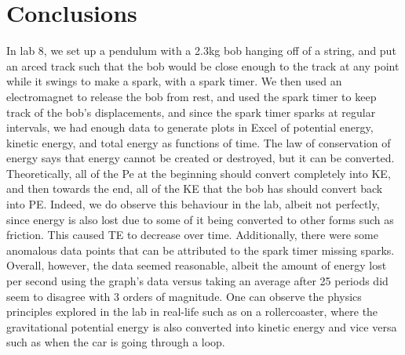 \documentclass[letterpaper]{article}
\begin{document}
\section{Conclusions}
  In lab 8, we set up a pendulum with a 2.3kg bob hanging off of a string, and put an arced track such that the bob would be close enough to the track at any point while it swings to make a spark, with a spark timer. We then used an electromagnet to release the bob from rest, and used the spark timer to keep track of the bob’s displacements, and since the spark timer sparks at regular intervals, we had enough data to generate plots in Excel of potential energy, kinetic energy, and total energy as functions of time. The law of conservation of energy says that energy cannot be created or destroyed, but it can be converted. Theoretically, all of the Pe at the beginning should convert completely into KE, and then towards the end, all of the KE that the bob has should convert back into PE. Indeed, we do observe this behaviour in the lab, albeit not perfectly, since energy is also lost due to some of it being converted to other forms such as friction. This caused TE to decrease over time. Additionally, there were some anomalous data points that can be attributed to the spark timer missing sparks. Overall, however, the data seemed reasonable, albeit the amount of energy lost per second using the graph’s data versus taking an average after 25 periods did seem to disagree with 3 orders of magnitude.  One can observe the physics principles explored in the lab in real-life such as on a rollercoaster, where the gravitational potential energy is also converted into kinetic energy and vice versa such as when the car is going through a loop.
\end{document}

